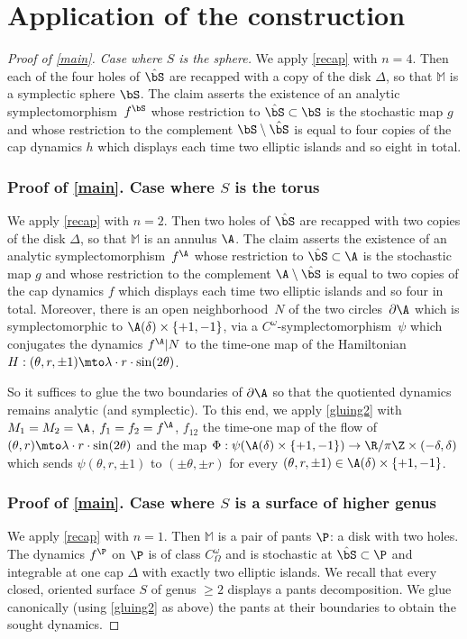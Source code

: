 \section{Application of the construction}\label{S4}
\label{S41}
\begin{proof}[Proof of \cref{main}. Case where $S$ is the sphere]
We apply \cref{recap} with $n=4$. Then each of the four holes of $\hat \bS$ are recapped with a copy of the disk $\Delta$, so that $\mathbb M$ is a symplectic sphere $\bS$. The claim asserts the existence of an analytic symplectomorphism~$f^{\bS}$ whose restriction to
$ \hat \bS\subset \bS$ is the stochastic map $g$ and whose restriction to the complement $ \bS\setminus \hat \bS$ is equal to four copies of the cap dynamics $h$ which displays each time two elliptic islands and so eight in total.

\subsubsection*{Proof of \cref{main}. Case where $S$ is the torus}
We apply \cref{recap} with $n=2$. Then two holes of $\hat \bS$ are recapped with two copies of the disk $\Delta$, so that $\mathbb M$ is an annu\-lus $\A$. The claim asserts the existence of an analytic symplectomorphism~$f^{\A}$ whose restriction to
$ \hat \bS\subset \A$ is the stochastic map $g$ and whose restriction to the complement $ \A\setminus \hat \bS$ is equal to two copies of the cap dynamics $f$ which displays each time two elliptic islands and so four in total. Moreover, there is an open neighborhood~$N$ of the two circles~$\partial \A$ which is symplectomorphic to $\A(\delta)\times \{+1,-1\}$, via a $C^\omega$\nobreakdash-symplectomorphism~$ \psi$ which conjugates the dynamics $f^\A|N$ to the time-one map of the Hamiltonian \hbox{$H: (\theta,r, \pm1)\mto \lambda\cdot r\cdot \sin(2\theta)$}.

So it suffices to glue the two boundaries of $\partial \A$ so that the quotiented dynamics remains analytic (and symplectic).
To this end, we apply \cref{gluing2} with $M_1=M_2=\A$, $f_1=f_2=f^\A$, $f_{12}$ the time-one map of the flow of $(\theta,r)\mto \lambda\cdot r\cdot \sin(2\theta)$ and the map $\Phi:
\psi(\A(\delta)\times \{+1,-1\})\to \R/\pi\Z \times (-\delta,\delta)$ which sends $\psi(\theta,r,\pm1)$ to $(\pm \theta, \pm r)$ for every $(\theta, r, \pm1)\in \A(\delta)\times \{+1,-1\}$.\enlargethispage{.5\baselineskip}%

\subsubsection*{Proof of \cref{main}. Case where $S$ is a surface of higher genus}
We apply \cref{recap} with $n=1$. Then $\mathbb M$ is a pair of pants $\P$: a disk with two holes. The dynamics $f^\P$ on $\P$ is of class $C^\omega_\Omega$ and is stochastic at $\hat \bS\subset \P$ and integrable at one cap $\Delta$ with exactly two elliptic islands. We recall that every closed, oriented surface $S$ of genus $\ge 2$ displays a pants decomposition. We glue canonically (using \cref{gluing2} as above) the pants at their boundaries to obtain the sought dynamics.
\end{proof}

